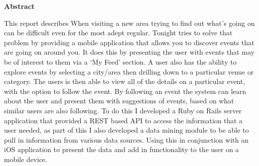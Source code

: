 \thispagestyle{empty}

\begin{center}
    {\LARGE\bf Abstract}
\end{center}

This report describes When visiting  a new area trying to find out what's going on can be difficult even for the most adept regular. Tonight tries to solve that problem by providing a mobile application that allows you to discover events that are going on around you. It does this by presenting the user with events that may be of interest to them via a `My Feed' section. A user also has the ability to explore events by selecting a city/area then drilling down to a particular venue or category. The users is then able to view all of the details on a particular event, with the option to follow the event. By following an event the system can learn about the user and present them with suggestions of events, based on what similar users are also following. To do this I developed a Ruby on Rails server application that provided a REST based API to access the information that a user needed, as part of this I also developed a data mining module to be able to pull in information from various data sources. Using this in conjunction with an iOS application to present the data and add in functionality to the user on a mobile device. 